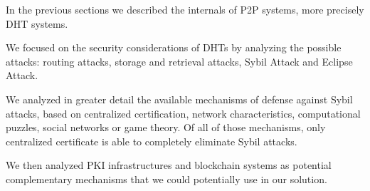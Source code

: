 In the previous sections we described the internals of \ac{P2P} systems, more precisely \ac{DHT} systems.

We focused on the security considerations of \acp{DHT} by analyzing the possible attacks: routing attacks, storage and retrieval attacks, Sybil Attack and Eclipse Attack.

We analyzed in greater detail the available mechanisms of defense against Sybil attacks, based on centralized certification, network characteristics, computational puzzles, social networks or game theory.
Of all of those mechanisms, only centralized certificate is able to completely eliminate Sybil attacks.

We then analyzed \ac{PKI} infrastructures and blockchain systems as potential complementary mechanisms that we could potentially use in our solution.

